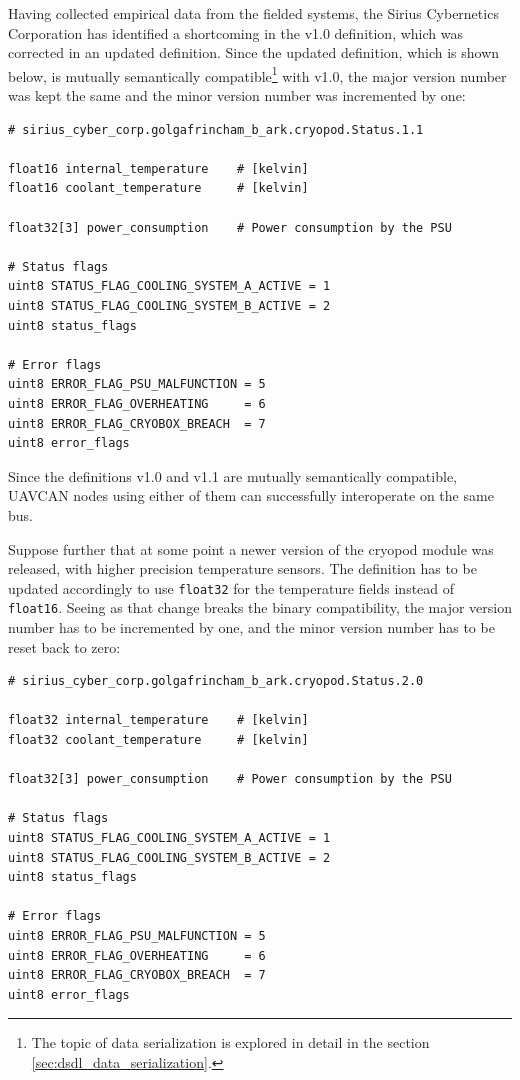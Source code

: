 Having collected empirical data from the fielded systems, the Sirius Cybernetics Corporation has
identified a shortcoming in the v1.0 definition, which was corrected in an updated definition.
Since the updated definition, which is shown below, is mutually semantically
compatible\footnote{The topic of data serialization is explored in detail in the section
\ref{sec:dsdl_data_serialization}.}
with v1.0, the major version number was kept the same and the minor version number was incremented by one:

\begin{verbatim}
# sirius_cyber_corp.golgafrincham_b_ark.cryopod.Status.1.1

float16 internal_temperature    # [kelvin]
float16 coolant_temperature     # [kelvin]

float32[3] power_consumption    # Power consumption by the PSU

# Status flags
uint8 STATUS_FLAG_COOLING_SYSTEM_A_ACTIVE = 1
uint8 STATUS_FLAG_COOLING_SYSTEM_B_ACTIVE = 2
uint8 status_flags

# Error flags
uint8 ERROR_FLAG_PSU_MALFUNCTION = 5
uint8 ERROR_FLAG_OVERHEATING     = 6
uint8 ERROR_FLAG_CRYOBOX_BREACH  = 7
uint8 error_flags
\end{verbatim}

Since the definitions v1.0 and v1.1 are mutually semantically compatible,
UAVCAN nodes using either of them can successfully interoperate on the same bus.

Suppose further that at some point a newer version of the cryopod module was released,
with higher precision temperature sensors.
The definition has to be updated accordingly to use \verb|float32| for the temperature fields
instead of \verb|float16|.
Seeing as that change breaks the binary compatibility,
the major version number has to be incremented by one, and the minor version number has to be reset back to zero:

\begin{verbatim}
# sirius_cyber_corp.golgafrincham_b_ark.cryopod.Status.2.0

float32 internal_temperature    # [kelvin]
float32 coolant_temperature     # [kelvin]

float32[3] power_consumption    # Power consumption by the PSU

# Status flags
uint8 STATUS_FLAG_COOLING_SYSTEM_A_ACTIVE = 1
uint8 STATUS_FLAG_COOLING_SYSTEM_B_ACTIVE = 2
uint8 status_flags

# Error flags
uint8 ERROR_FLAG_PSU_MALFUNCTION = 5
uint8 ERROR_FLAG_OVERHEATING     = 6
uint8 ERROR_FLAG_CRYOBOX_BREACH  = 7
uint8 error_flags
\end{verbatim}

